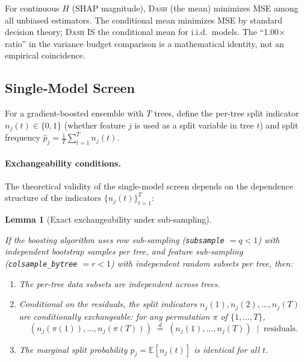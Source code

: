 \documentclass{article}
\newtheorem{lemma}[theorem]{Lemma}
\newcommand{\E}{\mathbb{E}}
\newcommand{\DASH}{\textsc{Dash}}
\begin{document}
For continuous $H$ (SHAP magnitude), \DASH{} (the mean) minimizes MSE among all unbiased estimators. The conditional mean minimizes MSE by standard decision theory; \DASH{} IS the conditional mean for i.i.d.\ models. The ``1.00$\times$ ratio'' in the variance budget comparison is a mathematical identity, not an empirical coincidence.

\subsection{Single-Model Screen}
\label{sec:f5}

\begin{sloppypar}
For a gradient-boosted ensemble with $T$ trees, define the per-tree split indicator
$n_j(t) \in \{0,1\}$ (whether feature $j$ is used as a split variable in tree $t$)
and split frequency $\hat{p}_j = \frac{1}{T}\sum_{t=1}^T n_j(t)$.
\end{sloppypar}

\paragraph{Exchangeability conditions.}
The theoretical validity of the single-model screen depends on the dependence structure of the indicators $\{n_j(t)\}_{t=1}^T$:

\begin{lemma}[Exact exchangeability under sub-sampling]
\label{lem:exchange-subsample}
\begin{sloppypar}
If the boosting algorithm uses row sub-sampling (\texttt{subsample} $= q < 1$) with
independent bootstrap samples per tree, and feature sub-sampling
(\texttt{colsample\_bytree} $= r < 1$) with independent random subsets per tree,
then:
\end{sloppypar}
\begin{enumerate}
    \item The per-tree data subsets are independent across trees.
    \item Conditional on the residuals, the split indicators $n_j(1), n_j(2), \ldots, n_j(T)$ are \emph{conditionally exchangeable}: for any permutation $\pi$ of $\{1, \ldots, T\}$,
    \[
        (n_j(\pi(1)), \ldots, n_j(\pi(T))) \;\overset{d}{=}\;
        (n_j(1), \ldots, n_j(T)) \;\mid\; \text{residuals}.
    \]
    \item The marginal split probability $p_j = \E[n_j(t)]$ is identical for all $t$.
\end{enumerate}
\end{lemma}
\end{document}
